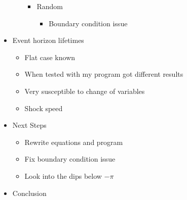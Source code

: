 \documentclass[12pt]{article}
\begin{document}
\begin{itemize}
\begin{itemize}
\begin{itemize}
\begin{itemize}
                        \end{itemize}

                    \item Random

                        \begin{itemize}

                            \item Boundary condition issue

                        \end{itemize}

                \end{itemize}

        \end{itemize}

    \item Event horizon lifetimes

        \begin{itemize}

            \item Flat case known

            \item When tested with my program got different results

            \item Very susceptible to change of variables

            \item Shock speed

        \end{itemize}

    \item Next Steps

        \begin{itemize}

            \item Rewrite equations and program

            \item Fix boundary condition issue

            \item Look into the dips below $-\pi$

        \end{itemize}

    \item Conclusion

\end{itemize}
\end{document}
